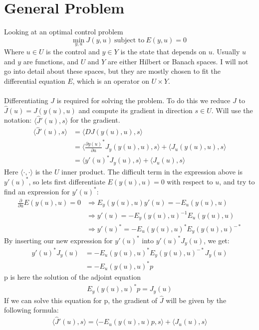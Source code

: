 \documentclass[11pt,a4paper]{article}
\begin{document}
\section{General Problem}
Looking at an optimal control problem $$\underset{y,u}{\text{min}} \ J(y,u) \ \text{subject to} \ E(y,u)=0$$ Where $u \in U$ is the control and $y \in Y$ is the state that depends on $u$. Usually $u$ and $y$ are functions, and $U$ and $Y$ are either Hilbert or Banach spaces. I will not go into detail about these spaces, but they are mostly chosen to fit the differential equation $E$, which is an operator on $U\times Y$.
\\
\\
Differentiating $J$ is required for solving the problem. To do this we reduce $J$ to $\hat{J}(u) = J(y(u),u) $ and compute its gradient in direction $s \in U$. Will use the notation: $\langle\hat{J}'(u),s\rangle$ for the gradient.
\begin{align*}    
\langle\hat{J}'(u),s\rangle &= \langle DJ(y(u),u) ,s\rangle \\ &= \langle \frac{\partial y(u)}{\partial u}^*J_y(y(u),u),s\rangle + \langle J_u(y(u),u),s\rangle \\ &= \langle y'(u)^*J_y(u),s\rangle +\langle J_u(u),s\rangle
\end{align*}
Here $\langle\cdot,\cdot\rangle$ is the $U$ inner product. The difficult term in the expression above is $y'(u)^*$, so lets first differentiate $E(y(u),u)=0$ with respect to $u$, and try to find an expression for $y'(u)^*$: 
\begin{align*}
\frac{\partial}{\partial u}E(y(u),u)=0 &\Rightarrow E_y(y(u),u)y'(u)=-E_u(y(u),u) \\ &\Rightarrow y'(u)=-E_y(y(u),u)^{-1}E_u(y(u),u) \\ &\Rightarrow y'(u)^* = -E_u(y(u),u)^*E_y(y(u),u)^{-*}
\end{align*} 
By inserting our new expression for $y'(u)^*$ into $y'(u)^*J_y(u)$, we get:
\begin{align*}
y'(u)^*J_y(u)&=-E_u(y(u),u)^*E_y(y(u),u)^{-*}J_y(u) \\
&=-E_u(y(u),u)^*p
\end{align*}
p is here the solution of the adjoint equation 
\begin{gather*}
E_y(y(u),u)^{*}p=J_y(u)
\end{gather*}
If we can solve this equation for p, the gradient of $\hat{J}$ will be given by the following formula:  
\begin{gather}
\langle\hat{J}'(u),s\rangle=\langle -E_u(y(u),u)p,s\rangle +\langle J_u(u),s\rangle
\end{gather} 
\end{document}
